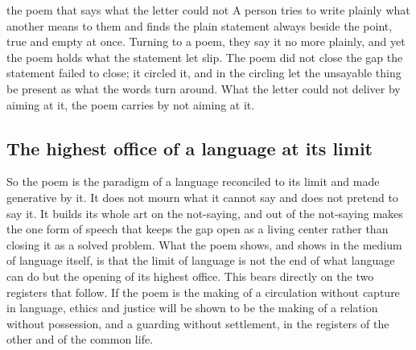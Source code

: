 \begin{casebox}{the poem that says what the letter could not}
A person tries to write plainly what another means to them and finds the plain statement always beside the point, true and empty at once. Turning to a poem, they say it no more plainly, and yet the poem holds what the statement let slip. The poem did not close the gap the statement failed to close; it circled it, and in the circling let the unsayable thing be present as what the words turn around. What the letter could not deliver by aiming at it, the poem carries by not aiming at it.
\end{casebox}

\subsection*{The highest office of a language at its limit}

So the poem is the paradigm of a language reconciled to its limit and made generative by it. It does not mourn what it cannot say and does not pretend to say it. It builds its whole art on the not-saying, and out of the not-saying makes the one form of speech that keeps the gap open as a living center rather than closing it as a solved problem. What the poem shows, and shows in the medium of language itself, is that the limit of language is not the end of what language can do but the opening of its highest office. This bears directly on the two registers that follow. If the poem is the making of a circulation without capture in language, ethics and justice will be shown to be the making of a relation without possession, and a guarding without settlement, in the registers of the other and of the common life.
